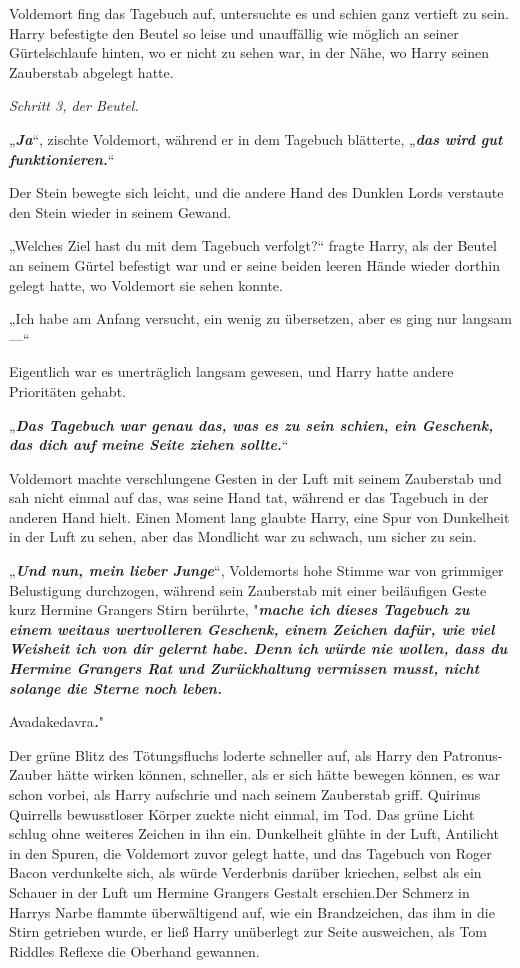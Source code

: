 {Voldemort fing das Tagebuch auf, untersuchte es und schien ganz vertieft zu sein. Harry befestigte den Beutel so leise und unauffällig wie möglich an seiner Gürtelschlaufe hinten, wo er nicht zu sehen war, in der Nähe, wo Harry seinen Zauberstab abgelegt hatte.

\emph{Schritt 3, der Beutel.}

„\textbf{\emph{Ja}}“, zischte Voldemort, während er in dem Tagebuch blätterte, „\textbf{\emph{das wird gut funktionieren.}}“

Der Stein bewegte sich leicht, und die andere Hand des Dunklen Lords verstaute den Stein wieder in seinem Gewand.

„Welches Ziel hast du mit dem Tagebuch verfolgt?“ fragte Harry, als der Beutel an seinem Gürtel befestigt war und er seine beiden leeren Hände wieder dorthin gelegt hatte, wo Voldemort sie sehen konnte.

„Ich habe am Anfang versucht, ein wenig zu übersetzen, aber es ging nur langsam—“

Eigentlich war es unerträglich langsam gewesen, und Harry hatte andere Prioritäten gehabt.

„\textbf{\emph{Das Tagebuch war genau das, was es zu sein schien, ein Geschenk, das dich auf meine Seite ziehen sollte.}}“

Voldemort machte verschlungene Gesten in der Luft mit seinem Zauberstab und sah nicht einmal auf das, was seine Hand tat, während er das Tagebuch in der anderen Hand hielt. Einen Moment lang glaubte Harry, eine Spur von Dunkelheit in der Luft zu sehen, aber das Mondlicht war zu schwach, um sicher zu sein.

„\textbf{\emph{Und nun, mein lieber Junge}}“, Voldemorts hohe Stimme war von grimmiger Belustigung durchzogen, während sein Zauberstab mit einer beiläufigen Geste kurz Hermine Grangers Stirn berührte, "\textbf{\emph{mache ich dieses Tagebuch zu einem weitaus wertvolleren Geschenk, einem Zeichen dafür, wie viel Weisheit ich von dir gelernt habe. Denn ich würde nie wollen, dass du Hermine Grangers Rat und Zurückhaltung vermissen musst, nicht solange die Sterne noch leben.}}

Avadakedavra\textbf{\emph{.}}"

Der grüne Blitz des Tötungsfluchs loderte schneller auf, als Harry den Patronus-Zauber hätte wirken können, schneller, als er sich hätte bewegen können, es war schon vorbei, als Harry aufschrie und nach seinem Zauberstab griff. Quirinus Quirrells bewusstloser Körper zuckte nicht einmal, im Tod. Das grüne Licht schlug ohne weiteres Zeichen in ihn ein. Dunkelheit glühte in der Luft, Antilicht in den Spuren, die Voldemort zuvor gelegt hatte, und das Tagebuch von Roger Bacon verdunkelte sich, als würde Verderbnis darüber kriechen, selbst als ein Schauer in der Luft um Hermine Grangers Gestalt erschien.Der Schmerz in Harrys Narbe flammte überwältigend auf, wie ein Brandzeichen, das ihm in die Stirn getrieben wurde, er ließ Harry unüberlegt zur Seite ausweichen, als Tom Riddles Reflexe die Oberhand gewannen.

}
